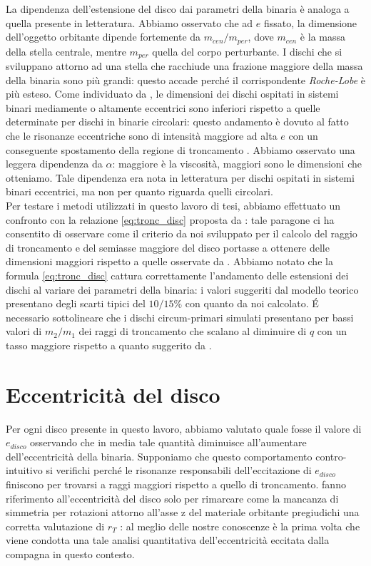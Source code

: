 La dipendenza dell'estensione del disco dai parametri della binaria è analoga a quella presente in letteratura. 
Abbiamo osservato che ad $e$ fissato, la dimensione dell'oggetto orbitante dipende fortemente da $m_{cen}/m_{per}$, dove $m_{cen}$ è la massa della stella centrale, mentre $m_{per}$ quella del corpo perturbante.
I dischi che si sviluppano attorno ad una stella che racchiude una frazione maggiore della massa della binaria sono più grandi: questo accade perché il corrispondente \textit{Roche-Lobe} è più esteso. 
Come individuato da \textcite{ArtymowiczLubow1994}, le dimensioni dei dischi ospitati in sistemi binari mediamente o altamente eccentrici sono inferiori rispetto a quelle determinate per dischi in binarie circolari: questo andamento è dovuto al fatto che le risonanze eccentriche sono
di intensità maggiore ad alta $e$ con un conseguente spostamento
della regione di troncamento \parencite{ArtymowiczLubow1994}. Abbiamo osservato una leggera dipendenza da $\alpha$: maggiore è la viscosità, maggiori sono le dimensioni che otteniamo.
Tale dipendenza era nota in letteratura per dischi ospitati in sistemi binari eccentrici, ma non per quanto riguarda quelli circolari.\\

Per testare i metodi utilizzati in questo lavoro di tesi, abbiamo effettuato un confronto con la relazione \eqref{eq:tronc_disc} proposta da \textcite{ManaraTronc2019}: tale paragone ci ha consentito di osservare come il criterio da noi sviluppato per il calcolo del raggio di troncamento e del semiasse maggiore del disco portasse a ottenere delle dimensioni maggiori rispetto a quelle osservate da \textcite{ArtymowiczLubow1994}. 
Abbiamo notato che la formula \eqref{eq:tronc_disc} cattura correttamente l'andamento delle estensioni dei dischi al variare dei parametri della binaria: i valori suggeriti dal modello teorico presentano degli scarti tipici del $10/15\%$ con quanto da noi calcolato.
\'E necessario sottolineare che i dischi circum-primari simulati presentano per bassi valori di $m_2/m_1$ dei raggi di troncamento che scalano al diminuire di $q$ con un tasso maggiore rispetto a quanto suggerito da \textcite{ManaraTronc2019}.

\section{Eccentricità del disco}

Per ogni disco presente in questo lavoro, abbiamo valutato quale fosse il valore di $e_{disco}$ osservando che in media tale quantità diminuisce all’aumentare dell’eccentricità della binaria.
Supponiamo che questo comportamento contro-intuitivo si verifichi perché le risonanze responsabili dell’eccitazione di $e_{disco}$ finiscono per trovarsi a raggi maggiori rispetto a quello di troncamento. 
\textcite{ArtymowiczLubow1994} fanno riferimento all'eccentricità del disco solo per rimarcare come la mancanza di simmetria per rotazioni
attorno all’asse z del materiale orbitante pregiudichi una corretta valutazione di $r_T$ : al meglio delle nostre conoscenze è la prima volta che viene condotta una tale analisi quantitativa dell'eccentricità eccitata dalla compagna in questo contesto.

